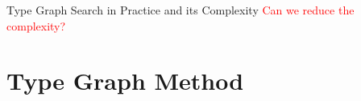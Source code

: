 \documentclass{beamer}
\newcommand{\graphbox}[8]{
  \begin{scope}[xshift=#2,yshift=#3]
    \draw [rounded corners=2mm] (0,0) rectangle (#4,-#5);
    \node at (0,0mm) [anchor=north west,inner sep=1mm] {#1};
    \begin{scope}[xshift=#4/2+#6,yshift=#7] 
    #8
    \end{scope}
  \end{scope}
}
\begin{document}
\begin{frame}{Type Graph Search in Practice and its Complexity
   }
    \textcolor{red}{Can we reduce the complexity?}
\end{frame}



\section{Type Graph Method}
\end{document}
